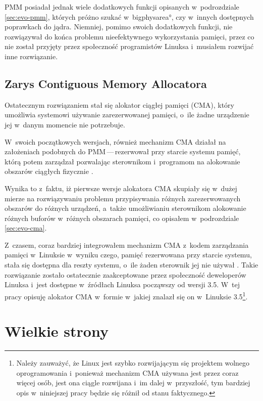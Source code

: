 PMM posiadał jednak wiele dodatkowych funkcji opisanych w~podrozdziale
\ref{sec:evo-pmm}, których próżno szukać w~\ang*{bigphysarea}, czy
w~innych dostępnych poprawkach do jądra.  Niemniej, pomimo swoich
dodatkowych funkcji, nie rozwiązywał do końca problemu nieefektywnego
wykorzystania pamięci, przez co nie został przyjęty przez społeczność
programistów Linuksa i~musiałem rozwijać inne rozwiązanie.

\subsection{Zarys Contiguous Memory Allocatora}

Ostatecznym rozwiązaniem stał się alokator ciągłej pamięci (CMA),
który umożliwia systemowi używanie zarezerwowanej pamięci, o~ile żadne
urządzenie jej w~danym momencie nie potrzebuje.

W~swoich początkowych wersjach, również mechanizm CMA działał na
założeniach podobnych do PMM\,---\,rezerwował przy starcie systemu
pamięć, którą potem zarządzał pozwalając sterownikom i~programom na
alokowanie obszarów ciągłych fizycznie \autocite{patch:cma-1}.

Wynika to z~faktu, iż pierwsze wersje alokatora CMA skupiały się
w~dużej mierze na rozwiązywaniu problemu przypisywania różnych
zarezerwowanych obszarów do różnych urządzeń, a~także umożliwianiu
sterownikom alokowanie różnych buforów w~różnych obszarach pamięci, co
opisałem w~podrozdziale \ref{sec:evo-cma}.

Z~czasem, coraz bardziej integrowałem mechanizm CMA z~kodem
zarządzania pamięci w~Linuksie w~wyniku czego, pamięć rezerwowana przy
starcie systemu, stała się dostępna dla reszty systemu, o~ile żaden
sterownik jej nie używał \autocite{patch:cma-24}.  Takie rozwiązanie
zostało ostatecznie zaakceptowane przez społeczność deweloperów
Linuksa i~jest dostępne w~źródłach Linuksa począwszy od wersji 3.5.
W~tej pracy opisuję alokator CMA w~formie w~jakiej znalazł się on
w~Linuksie 3.5\footnote{Należy zauważyć, że Linux jest szybko
  rozwijającym się projektem wolnego oprogramowania i~ponieważ
  mechanizm CMA używana jest przez coraz więcej osób, jest ona ciągle
  rozwijana i~im dalej w~przyszłość, tym bardziej opis w~niniejszej
  pracy będzie się różnił od stanu faktycznego.}.

\section{Wielkie strony}

